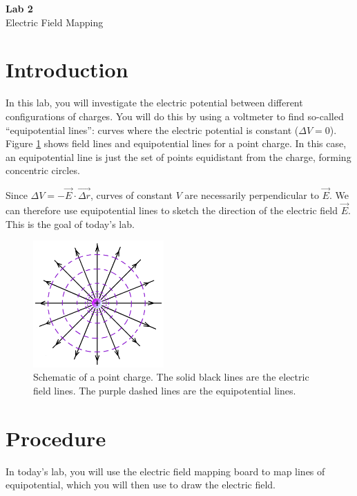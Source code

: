 \documentclass{article}
\begin{document}
	\fancyfoot[C]{\thepage}
	\vspace*{0cm}
	\begin{center}
		{\LARGE \textbf{Lab 2}}\\
		{\Large Electric Field Mapping}
	\end{center}
	
	\section*{Introduction}
	In this lab, you will investigate the electric potential between different configurations of charges. You will do this by using a voltmeter to find so-called ``equipotential lines'': curves where the electric potential is constant ($\Delta V=0$). Figure \ref{fig::equipotential} shows field lines and equipotential lines for a point charge. In this case, an equipotential line is just the set of points equidistant from the charge, forming concentric circles. 
	
	Since $\Delta V = -\vec{E}\cdot{\vec{\Delta r}}$, curves of constant $V$ are necessarily perpendicular to $\vec{E}$. We can therefore use equipotential lines to sketch the direction of the electric field $\vec{E}$. This is the goal of today's lab.
	
	\begin{figure}[ht!]
		\centering
		\includegraphics[width=5cm]{equipotential.png}
		\caption{Schematic of a point charge. The solid black lines are the electric field lines. The
			purple dashed lines are the equipotential lines.}
		\label{fig::equipotential}
	\end{figure}
	
	\section*{Procedure}
	In today's lab, you will use the electric field mapping board to map lines of equipotential, which you will then use to draw the electric field.
	
\end{document}
